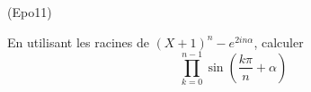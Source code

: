 \begin{tiny}(Epo11)\end{tiny} En utilisant les racines de $(X+1)^{n}-e^{2in\alpha }$, calculer
\[
\prod_{k=0}^{n-1}\sin (\frac{k\pi }{n}+\alpha )
\]